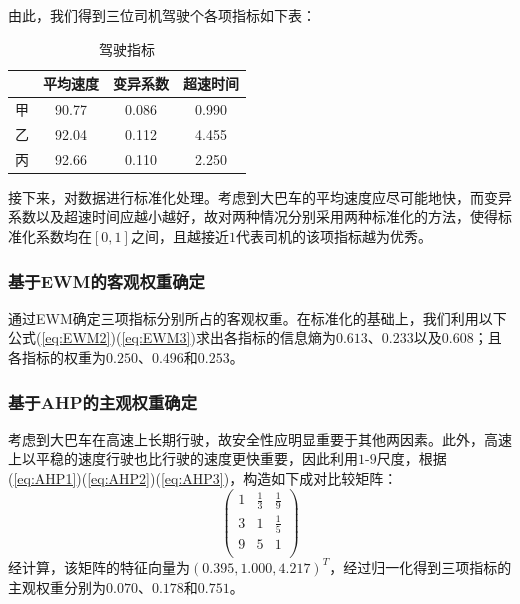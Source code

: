 \documentclass[bwprint]{cumcmthesis}
\begin{document}
        由此，我们得到三位司机驾驶个各项指标如下表：
        
        \begin{table}[htbp]
            \centering
            \caption{驾驶指标}
                \begin{tabular}{|c|c|c|c|}
                \hline
                & 平均速度 & 变异系数 & 超速时间 \\
                \hline
                甲     & 90.77 & 0.086 & 0.990 \\
                \hline
                乙     & 92.04 & 0.112 & 4.455 \\
                \hline
                丙     & 92.66 & 0.110 & 2.250 \\
                \hline
                \end{tabular}
            \label{tab:seven}
          \end{table}

        接下来，对数据进行标准化处理。考虑到大巴车的平均速度应尽可能地快，而变异系数以及超速时间应越小越好，故对两种情况分别采用两种标准化的方法，使得标准化系数均在$[0,1]$之间，且越接近$1$代表司机的该项指标越为优秀。

            \subsubsection{基于EWM的客观权重确定}
            通过EWM确定三项指标分别所占的客观权重。在标准化的基础上，我们利用以下公式(\ref{eq:EWM2})(\ref{eq:EWM3})求出各指标的信息熵为$0.613$、$0.233$以及$0.608$；且各指标的权重为$0.250$、$0.496$和$0.253$。


            \subsubsection{基于AHP的主观权重确定}
            考虑到大巴车在高速上长期行驶，故安全性应明显重要于其他两因素。此外，高速上以平稳的速度行驶也比行驶的速度更快重要，因此利用$1$-$9$尺度，根据(\ref{eq:AHP1})(\ref{eq:AHP2})(\ref{eq:AHP3})，构造如下成对比较矩阵：
            \[
            \begin{pmatrix}
                1 & \frac{1}{3} & \frac{1}{9}  \\
                3 & 1 & \frac{1}{5}  \\
                9 & 5 & 1  \\
            \end{pmatrix}
            \]
            经计算，该矩阵的特征向量为$(0.395,1.000,4.217)^T$，经过归一化得到三项指标的主观权重分别为$0.070$、$0.178$和$0.751$。
\end{document}
